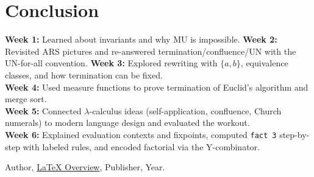 \documentclass{article}
\theoremstyle{theorem}
\theoremstyle{definition}
\theoremstyle{remark}
\begin{document}
\section{Conclusion}
\textbf{Week 1:} Learned about invariants and why MU is impossible.  
\textbf{Week 2:} Revisited ARS pictures and re-answered termination/confluence/UN with the UN-for-all convention.  
\textbf{Week 3:} Explored rewriting with $\{a,b\}$, equivalence classes, and how termination can be fixed.\\
\textbf{Week 4:} Used measure functions to prove termination of Euclid's algorithm and merge sort.\\
\textbf{Week 5:} Connected $\lambda$-calculus ideas (self-application, confluence, Church numerals) to modern language design and evaluated the workout.\\
\textbf{Week 6:} Explained evaluation contexts and fixpoints, computed \texttt{fact 3} step-by-step with labeled rules, and encoded factorial via the Y-combinator.

\begin{thebibliography}{99}
 Author, \href{https://en.wikipedia.org/wiki/LaTeX}{LaTeX Overview}, Publisher, Year.
\end{thebibliography}
\end{document}
